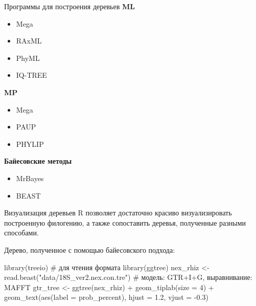 \documentclass[
  ignorenonframetext,
  russian,
]{beamer}
\newenvironment{Shaded}{\begin{snugshade}}{\end{snugshade}}
\newcommand{\AttributeTok}[1]{\textcolor[rgb]{0.40,0.45,0.13}{#1}}
\newcommand{\CommentTok}[1]{\textcolor[rgb]{0.37,0.37,0.37}{#1}}
\newcommand{\DecValTok}[1]{\textcolor[rgb]{0.68,0.00,0.00}{#1}}
\newcommand{\FloatTok}[1]{\textcolor[rgb]{0.68,0.00,0.00}{#1}}
\newcommand{\FunctionTok}[1]{\textcolor[rgb]{0.28,0.35,0.67}{#1}}
\newcommand{\NormalTok}[1]{\textcolor[rgb]{0.00,0.23,0.31}{#1}}
\newcommand{\OtherTok}[1]{\textcolor[rgb]{0.00,0.23,0.31}{#1}}
\newcommand{\SpecialCharTok}[1]{\textcolor[rgb]{0.37,0.37,0.37}{#1}}
\newcommand{\StringTok}[1]{\textcolor[rgb]{0.13,0.47,0.30}{#1}}
\begin{document}
\begin{frame}{Программы для построения деревьев}
\protect{}\label{ux43fux440ux43eux433ux440ux430ux43cux43cux44b-ux434ux43bux44f-ux43fux43eux441ux442ux440ux43eux435ux43dux438ux44f-ux434ux435ux440ux435ux432ux44cux435ux432}
\textbf{ML}

\begin{itemize}
\item
  Mega
\item
  RAxML
\item
  PhyML
\item
  IQ-TREE
\end{itemize}

\textbf{MP}

\begin{itemize}
\item
  Mega
\item
  PAUP
\item
  PHYLIP
\end{itemize}

\textbf{Байесовские методы}

\begin{itemize}
\item
  MrBayes
\item
  BEAST
\end{itemize}
\end{frame}

\begin{frame}[fragile]{Визуализация деревьев}
\protect{}\label{ux432ux438ux437ux443ux430ux43bux438ux437ux430ux446ux438ux44f-ux434ux435ux440ux435ux432ux44cux435ux432}
R позволяет достаточно красиво визуализировать построенную филогению, а
также сопоставить деревья, полученные разными способами.

Дерево, полученное с помощью байесовского подхода:

\begin{Shaded}
\begin{Highlighting}[]
\FunctionTok{library}\NormalTok{(treeio) }\CommentTok{\# для чтения формата }
\FunctionTok{library}\NormalTok{(ggtree)}
\NormalTok{nex\_rhiz }\OtherTok{\textless{}{-}} \FunctionTok{read.beast}\NormalTok{(}\StringTok{"data/18S\_ver2.nex.con.tre"}\NormalTok{) }\CommentTok{\# модель: GTR+I+G, выравнивание: MAFFT}
\NormalTok{gtr\_tree }\OtherTok{\textless{}{-}} \FunctionTok{ggtree}\NormalTok{(nex\_rhiz) }\SpecialCharTok{+}
  \FunctionTok{geom\_tiplab}\NormalTok{(}\AttributeTok{size =} \DecValTok{4}\NormalTok{) }\SpecialCharTok{+}
  \FunctionTok{geom\_text}\NormalTok{(}\FunctionTok{aes}\NormalTok{(}\AttributeTok{label =}\NormalTok{ prob\_percent),}
            \AttributeTok{hjust =} \FloatTok{1.2}\NormalTok{, }\AttributeTok{vjust =} \SpecialCharTok{{-}}\FloatTok{0.3}\NormalTok{)}
\end{Highlighting}
\end{Shaded}
\end{frame}
\end{document}
